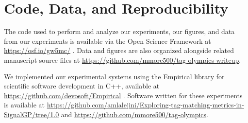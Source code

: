 \section{Code, Data, and Reproducibility}

The code used to perform and analyze our experiments, our figures, and data from our experiments is available via the Open Science Framework at \url{https://osf.io/gw5mc/} \citep{foster2017open}.
Data and figures are also organized alongside related manuscript source files at \url{https://github.com/mmore500/tag-olympics-writeup}.

We implemented our experimental systems using the Empirical library for scientific software development in C++, available at \url{https://github.com/devosoft/Empirical} \citep{charles_ofria_2019_2575607}.
Software written for these experiments is available at \url{https://github.com/amlalejini/Exploring-tag-matching-metrics-in-SignalGP/tree/1.0} and \url{https://github.com/mmore500/tag-olympics}.
